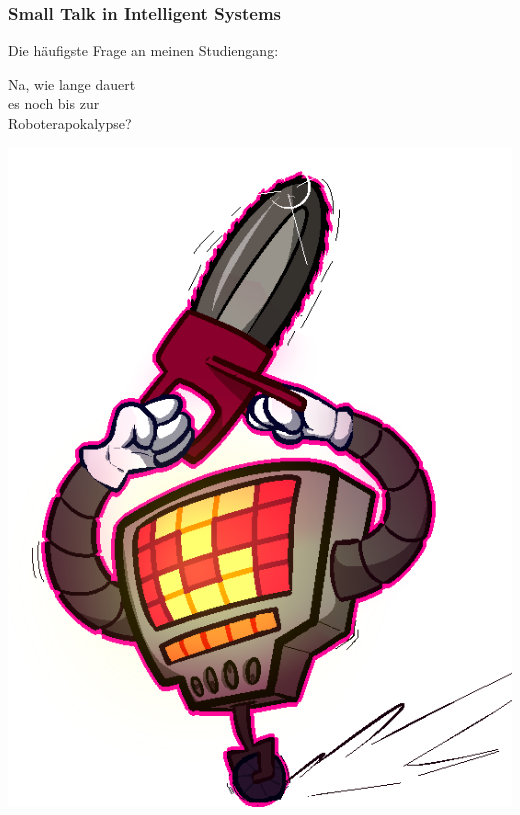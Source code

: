 \documentclass[aspectratio=169,x11names]{beamer}
\begin{document}
\begin{frame}
\frametitle{Small Talk in Intelligent Systems}

\begin{multicols}{2}

Die häufigste Frage an meinen Studiengang:

\pause

\begin{center}
\glqq Na, wie lange dauert\\ es noch bis zur\\ Roboterapokalypse?\grqq
\end{center}

\columnbreak

\begin{center}
\includegraphics[height=0.7\textheight,keepaspectratio]{images/mtt.png} 
\end{center}

\end{multicols}

\end{frame}
\end{document}
